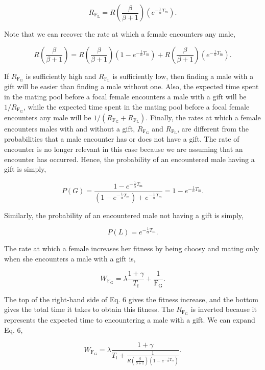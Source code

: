 \documentclass[
]{article}
\begin{document}
\[R_{\mathrm{F_{L}}} = R \left(\frac{\beta}{\beta + 1}\right)\left(e^{-\frac{1}{\alpha}T_{m}}\right).\]

Note that we can recover the rate at which a female encounters any male,

\[R \left(\frac{\beta}{\beta + 1}\right) = R \left(\frac{\beta}{\beta + 1}\right) \left(1 - e^{-\frac{1}{\alpha}T_{\mathrm{m}}}\right) + R \left(\frac{\beta}{\beta + 1}\right) \left(e^{-\frac{1}{\alpha}T_{\mathrm{m}}}\right).\]

If \(R_{\mathrm{F_{G}}}\) is sufficiently high and
\(R_{\mathrm{F_{L}}}\) is sufficiently low, then finding a male with a
gift will be easier than finding a male without one. Also, the expected
time spent in the mating pool before a focal female encounters a male
with a gift will be \(1/R_{\mathrm{F_{G}}}\), while the expected time
spent in the mating pool before a focal female encounters any male will
be \(1 / (R_{\mathrm{F_{G}}} + R_{\mathrm{F_{L}}})\). Finally, the rates
at which a female encounters males with and without a gift,
\(R_{\mathrm{F_{G}}}\) and \(R_{\mathrm{F_{L}}}\), are different from
the probabilities that a male encounter has or does not have a gift. The
rate of encounter is no longer relevant in this case because we are
assuming that an encounter has occurred. Hence, the probability of an
encountered male having a gift is simply,

\[P(G) = \frac{1 - e^{-\frac{1}{\alpha}T_{\mathrm{m}}}}{\left(1 - e^{-\frac{1}{\alpha}T_{\mathrm{m}}}\right) + e^{-\frac{1}{\alpha}T_{\mathrm{m}}}} = 1 - e^{-\frac{1}{\alpha}T_{\mathrm{m}}}.\]

Similarly, the probability of an encountered male not having a gift is
simply,

\[P(L) = e^{-\frac{1}{\alpha}T_{\mathrm{m}}}.\]

The rate at which a female increases her fitness by being choosy and
mating only when she encounters a male with a gift is,

\begin{equation}
W_{\mathrm{F_{G}}} = \lambda \frac{1 + \gamma}{T_{\mathrm{f}}} + \frac{1}{\mathrm{F_{G}}}.
\end{equation}

The top of the right-hand side of Eq. 6 gives the fitness increase, and
the bottom gives the total time it takes to obtain this fitness. The
\(R_{\mathrm{F_{G}}}\) is inverted because it represents the expected
time to encountering a male with a gift. We can expand Eq. 6,

\[W_{\mathrm{F_{G}}} = \lambda \frac{1 + \gamma}{T_{\mathrm{f}} + \frac{1}{R \left(\frac{\beta}{\beta + 1}\right)\left(1 - e^{-\frac{1}{\alpha}T_{\mathrm{m}}}\right)}}.\]
\end{document}
